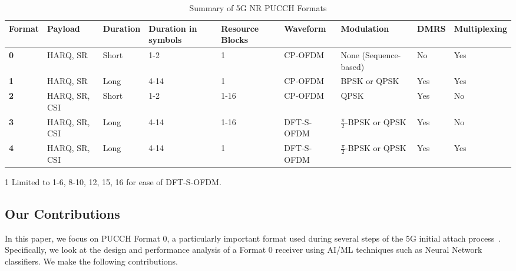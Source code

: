 \documentclass[journal]{IEEEtran}
\begin{document}
\begin{table}[h]
\begin{threeparttable}
    \caption{Summary of 5G NR PUCCH Formats}
    \centering
    \begin{tabular}{|C{0.8cm}|C{2.3cm}|C{1.1cm}|C{1.2cm}|C{1.2cm}|C{1.9cm}|C{2.2cm}|C{1.2cm}|C{1.45cm}|}
        \hline
        \textbf{Format} & \textbf{Payload} & \textbf{Duration} & \textbf{Duration in symbols} & \textbf{Resource Blocks} & \textbf{Waveform} & \textbf{Modulation} & \textbf{DMRS} & \textbf{Multiplexing} \\ 
        \hline
        \hline
        \textbf{0} & HARQ, SR & Short & 1-2 & 1 & CP-OFDM & None (Sequence-based) & No & Yes\\
        \hline
        \textbf{1} & HARQ, SR & Long & 4-14 & 1 & CP-OFDM & BPSK or QPSK & Yes & Yes\\
        \hline
        \textbf{2} & HARQ, SR, CSI & Short & 1-2 & 1-16 & CP-OFDM & QPSK & Yes & No\\
        \hline
        \textbf{3} & HARQ, SR, CSI & Long & 4-14 & 1-16 & DFT-S-OFDM & $\frac{\pi}{2}$-BPSK or QPSK & Yes & No\\
        \hline
        \textbf{4} & HARQ, SR, CSI  & Long & 4-14 & 1 & DFT-S-OFDM & $\frac{\pi}{2}$-BPSK or QPSK & Yes & Yes\\
        \hline
    \end{tabular}
    \begin{tablenotes}
    \item[1] Limited to 1-6, 8-10, 12, 15, 16 for ease of DFT-S-OFDM.
  \end{tablenotes}
    \label{tab: pucch_summary}
\end{threeparttable}
\end{table}

\subsection{Our Contributions}
In this paper, we focus on  PUCCH Format 0, a particularly important format used during several steps of the 5G initial attach process~\cite{5g_init}. Specifically, we look at the design and performance analysis of a Format 0 receiver using AI/ML techniques such as Neural Network classifiers. We make the following contributions. 
\end{document}
